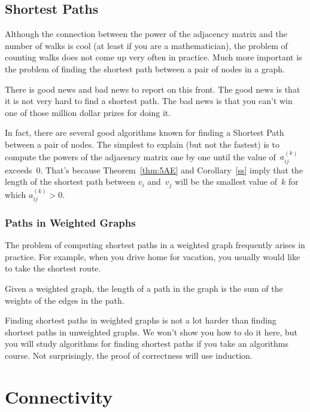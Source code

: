 \subsection{Shortest Paths}

Although the connection between the power of the adjacency matrix and
the number of walks is cool (at least if you are a mathematician), the
problem of counting walks does not come up very often in practice.
Much more important is the problem of finding the shortest path
between a pair of nodes in a graph.

There is good news and bad news to report on this front.  The good
news is that it is not very hard to find a shortest path.  The bad
news is that you can't win one of those million dollar prizes for
doing it.

In fact, there are several good algorithms known for finding a
Shortest Path between a pair of nodes.  The simplest to explain (but
not the fastest) is to compute the powers of the adjacency matrix one
by one until the value of~$a_{ij}^{(k)}$ exceeds~0.  That's because
Theorem~\ref{thm:5AE} and Corollary~\ref{ss} imply that the length of
the shortest path between $v_i$ and~$v_j$ will be the smallest value
of~$k$ for which $a_{ij}^{(k)} > 0$.

\subsubsection{Paths in Weighted Graphs}

The problem of computing shortest paths in a weighted graph frequently
arises in practice. For example, when you drive home for vacation, you
usually would like to take the shortest route.

\begin{definition}\label{def:5H}
Given a weighted graph, the length of a path in the graph is the sum
of the weights of the edges in the path.
\end{definition}

Finding shortest paths in weighted graphs is not a lot harder than
finding shortest paths in unweighted graphs.  We won't show you how to
do it here, but you will study algorithms for finding shortest paths
if you take an algorithms course.  Not surprisingly, the proof of
correctness will use induction.

\section{Connectivity}

